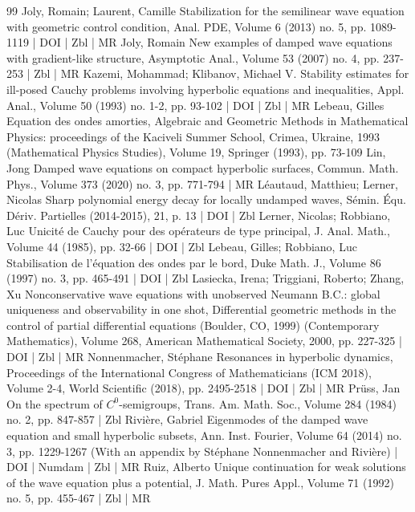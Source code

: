 \documentclass[10pt]{amsart}
\theoremstyle{definition}\newtheorem{defi}[theo]{Definition}\newtheorem{rema}[theo]{Remark}\newtheorem{exam}[theo]{Example}\newtheorem{exem}[theo]{Example}\newtheorem{nota}[theo]{Notation}
\begin{document}
\begin{thebibliography}{99}
Joly, Romain; Laurent, Camille Stabilization for the semilinear wave equation with geometric control condition, Anal. PDE, Volume 6 (2013) no. 5, pp. 1089-1119 | DOI | Zbl | MR
Joly, Romain New examples of damped wave equations with gradient-like structure, Asymptotic Anal., Volume 53 (2007) no. 4, pp. 237-253 | Zbl | MR
Kazemi, Mohammad; Klibanov, Michael V. Stability estimates for ill-posed Cauchy problems involving hyperbolic equations and inequalities, Appl. Anal., Volume 50 (1993) no. 1-2, pp. 93-102 | DOI | Zbl | MR
Lebeau, Gilles Equation des ondes amorties, Algebraic and Geometric Methods in Mathematical Physics: proceedings of the Kaciveli Summer School, Crimea, Ukraine, 1993 (Mathematical Physics Studies), Volume 19, Springer (1993), pp. 73-109
Lin, Jong Damped wave equations on compact hyperbolic surfaces, Commun. Math. Phys., Volume 373 (2020) no. 3, pp. 771-794 | MR
Léautaud, Matthieu; Lerner, Nicolas Sharp polynomial energy decay for locally undamped waves, Sémin. Équ. Dériv. Partielles (2014-2015), 21, p. 13 | DOI | Zbl
Lerner, Nicolas; Robbiano, Luc Unicité de Cauchy pour des opérateurs de type principal, J. Anal. Math., Volume 44 (1985), pp. 32-66 | DOI | Zbl
Lebeau, Gilles; Robbiano, Luc Stabilisation de l’équation des ondes par le bord, Duke Math. J., Volume 86 (1997) no. 3, pp. 465-491 | DOI | Zbl
Lasiecka, Irena; Triggiani, Roberto; Zhang, Xu Nonconservative wave equations with unobserved Neumann B.C.: global uniqueness and observability in one shot, Differential geometric methods in the control of partial differential equations (Boulder, CO, 1999) (Contemporary Mathematics), Volume 268, American Mathematical Society, 2000, pp. 227-325 | DOI | Zbl | MR
Nonnenmacher, Stéphane Resonances in hyperbolic dynamics, Proceedings of the International Congress of Mathematicians (ICM 2018), Volume 2-4, World Scientific (2018), pp. 2495-2518 | DOI | Zbl | MR
Prüss, Jan On the spectrum of ${C}^0$-semigroups, Trans. Am. Math. Soc., Volume 284 (1984) no. 2, pp. 847-857 | Zbl
Rivière, Gabriel Eigenmodes of the damped wave equation and small hyperbolic subsets, Ann. Inst. Fourier, Volume 64 (2014) no. 3, pp. 1229-1267 (With an appendix by Stéphane Nonnenmacher and Rivière) | DOI | Numdam | Zbl | MR
Ruiz, Alberto Unique continuation for weak solutions of the wave equation plus a potential, J. Math. Pures Appl., Volume 71 (1992) no. 5, pp. 455-467 | Zbl | MR

\end{thebibliography}
\end{document}
